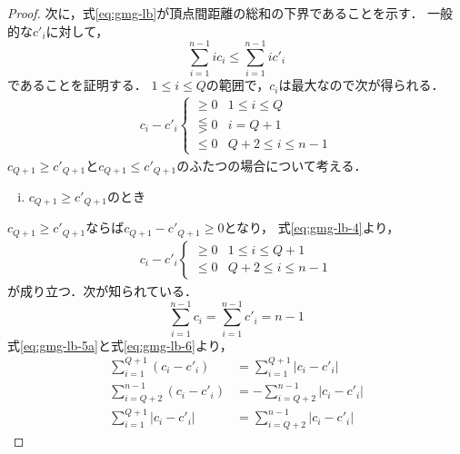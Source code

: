 \begin{proof}
  次に，式\ref{eq:gmg-lb}が頂点間距離の総和の下界であることを示す．
  一般的な$c'_i$に対して，
  \begin{equation}
    \label{eq:gmg-lb-3}
    \sum_{i=1}^{n-1}i c_i \leq \sum_{i=1}^{n-1}i c'_i
  \end{equation}
  であることを証明する．
  $1\leq i\leq Q$の範囲で，$c_i$は最大なので次が得られる．
  \begin{equation}
    \label{eq:gmg-lb-4}
    \begin{aligned}
      c_i - c'_i
      \begin{cases}
        \geq 0 & 1\leq i\leq Q \\
        \lesseqgtr 0 & i = Q+1 \\
        \leq 0 & Q+2\leq i\leq n-1
      \end{cases}
    \end{aligned}
  \end{equation}
  $c_{Q+1}\geq c'_{Q+1}$と$c_{Q+1}\leq c'_{Q+1}$のふたつの場合について考える．
  \begin{enumerate}[(i)]
  \item $c_{Q+1}\geq c'_{Q+1}$のとき
  \end{enumerate}
  $c_{Q+1}\geq c'_{Q+1}$ならば$c_{Q+1}-c'_{Q+1}\geq0$となり，
  式\ref{eq:gmg-lb-4}より，
  \begin{equation}
    \label{eq:gmg-lb-5a}
    \begin{aligned}
      c_i-c'_i
      \begin{cases}
        \geq 0 & 1\leq i\leq Q+1 \\
        \leq 0 & Q+2\leq i\leq n-1
      \end{cases}
    \end{aligned}
  \end{equation}
  が成り立つ．次が知られている．
  \begin{equation}
    \label{eq:gmg-lb-6}
    \sum_{i=1}^{n-1}c_i = \sum_{i=1}^{n-1}c'_i = n-1
  \end{equation}
  式\ref{eq:gmg-lb-5a}と式\ref{eq:gmg-lb-6}より，
  \begin{equation}
    \label{eq:gmg-lb-7a}
    \begin{aligned}
      \sum_{i=1}^{Q+1}(c_i-c'_i) &= \sum_{i=1}^{Q+1}|c_i-c'_i| \\
      \sum_{i=Q+2}^{n-1}(c_i-c'_i) &= -\sum_{i=Q+2}^{n-1}|c_i-c'_i| \\
      \sum_{i=1}^{Q+1}|c_i-c'_i| &= \sum_{i=Q+2}^{n-1}|c_i-c'_i|
    \end{aligned}
  \end{equation}

\end{proof}
